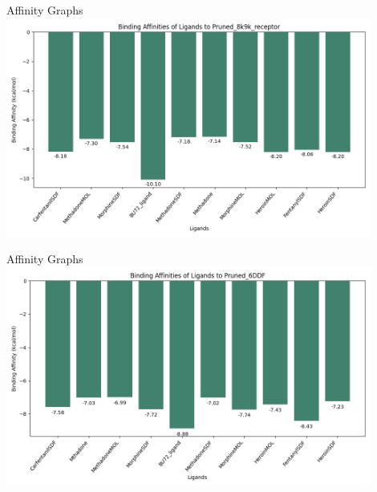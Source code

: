 \documentclass{beamer}
\begin{document}
\begin{frame}{Affinity Graphs}
\includegraphics[width=12cm]{img/Graphs/Pruned_8k9k_receptor_affinities.png}
\end{frame}
\begin{frame}{Affinity Graphs}
\includegraphics[width=12cm]{img/Graphs/Pruned_6DDF_affinities.png}
\end{frame}
\end{document}
